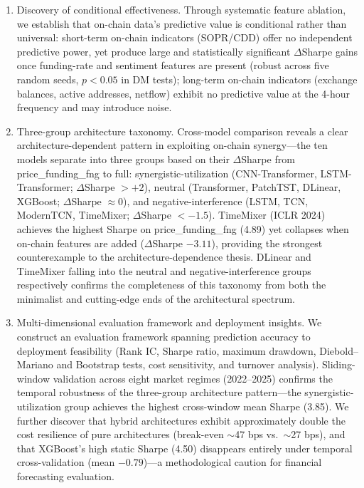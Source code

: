 \documentclass[a4paper]{cas-dc}
\begin{document}
\begin{enumerate}[label=(\arabic*),leftmargin=1.5em]
    \item Discovery of conditional effectiveness. Through systematic feature ablation, we establish that on-chain data's predictive value is conditional rather than universal: short-term on-chain indicators (SOPR/CDD) offer no independent predictive power, yet produce large and statistically significant $\Delta$Sharpe gains once funding-rate and sentiment features are present (robust across five random seeds, $p<0.05$ in DM tests); long-term on-chain indicators (exchange balances, active addresses, netflow) exhibit no predictive value at the 4-hour frequency and may introduce noise.
    \item Three-group architecture taxonomy. Cross-model comparison reveals a clear architecture-dependent pattern in exploiting on-chain synergy---the ten models separate into three groups based on their $\Delta$Sharpe from price\_funding\_fng to full: synergistic-utilization (CNN-Transformer, LSTM-Transformer; $\Delta$Sharpe $> +2$), neutral (Transformer, PatchTST, DLinear, XGBoost; $\Delta$Sharpe $\approx 0$), and negative-interference (LSTM, TCN, ModernTCN, TimeMixer; $\Delta$Sharpe $< -1.5$). TimeMixer (ICLR 2024) achieves the highest Sharpe on price\_funding\_fng (4.89) yet collapses when on-chain features are added ($\Delta$Sharpe $-3.11$), providing the strongest counterexample to the architecture-dependence thesis. DLinear and TimeMixer falling into the neutral and negative-interference groups respectively confirms the completeness of this taxonomy from both the minimalist and cutting-edge ends of the architectural spectrum.
    \item Multi-dimensional evaluation framework and deployment insights. We construct an evaluation framework spanning prediction accuracy to deployment feasibility (Rank IC, Sharpe ratio, maximum drawdown, Diebold--Mariano and Bootstrap tests, cost sensitivity, and turnover analysis). Sliding-window validation across eight market regimes (2022--2025) confirms the temporal robustness of the three-group architecture pattern---the synergistic-utilization group achieves the highest cross-window mean Sharpe (3.85). We further discover that hybrid architectures exhibit approximately double the cost resilience of pure architectures (break-even $\sim$47 bps vs.\ $\sim$27 bps), and that XGBoost's high static Sharpe (4.50) disappears entirely under temporal cross-validation (mean $-0.79$)---a methodological caution for financial forecasting evaluation.
\end{enumerate}
\end{document}
